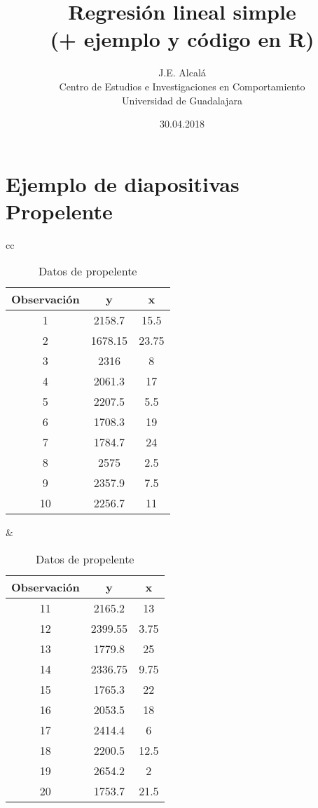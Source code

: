 \documentclass[letterpaper,12pt]{article}
\title{Regresión lineal simple\\ 
	\normalsize(+ ejemplo y código en R)}
\author{J.E. Alcal\'a\\
	    Centro de Estudios e Investigaciones en Comportamiento\\
		Universidad de Guadalajara}
\date{30.04.2018}
\begin{document}
	\maketitle	
	
\section*{Ejemplo de diapositivas\\ 
	Propelente}

\begin{center}
	\begin{table}[htpb] 
	\caption{Datos de propelente}
	\label{tabla_1}
		\begin{tabular}{cc}
			\begin{minipage}{.5\linewidth}
				\centering
				\begin{tabular}{ccc}
		\hline \rowcolor[HTML]{EFEFEF} 
		Observación & y & x \\ \hline
		1 & 2158.7 & 15.5 \\
		2 & 1678.15 & 23.75 \\
		3 & 2316 & 8 \\
		4 & 2061.3 & 17 \\
		5 & 2207.5 & 5.5 \\
		6 & 1708.3 & 19 \\
		7 & 1784.7 & 24 \\
		8 & 2575 & 2.5 \\
		9 & 2357.9 & 7.5 \\
		10 & 2256.7 & 11 \\\hline
				\end{tabular}
		\end{minipage} &

		\begin{minipage}{.5\linewidth}
	\centering
	\begin{tabular}{ccc}
		\hline \rowcolor[HTML]{EFEFEF} 
		Observación & y & x \\\hline
		11 & 2165.2 & 13 \\
		12 & 2399.55 & 3.75 \\
		13 & 1779.8 & 25 \\
		14 & 2336.75 & 9.75 \\
		15 & 1765.3 & 22 \\
		16 & 2053.5 & 18 \\
		17 & 2414.4 & 6 \\
		18 & 2200.5 & 12.5 \\
		19 & 2654.2 & 2 \\
		20 & 1753.7 & 21.5\\ \hline
		\end{tabular}
	\end{minipage} 
	\end{tabular}
 \end{table}
\end{center}
\end{document}
